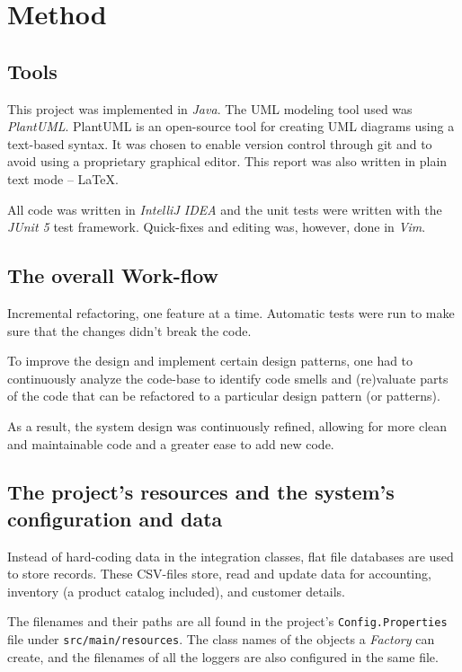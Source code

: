 \documentclass[a4paper]{scrreprt}
\begin{document}


\chapter{Method}
\section*{Tools}
This project was implemented in \emph{Java}.
The UML modeling tool used was \emph{PlantUML}.
PlantUML is an open-source tool for creating UML diagrams using a text-based
syntax.
It was chosen to enable version control through git and to avoid using a
proprietary graphical editor.
This report was also written in plain text mode -- \LaTeX.

All code was written in \emph{IntelliJ IDEA} and the unit tests were written with the \emph{JUnit 5} test framework.
Quick-fixes and editing was, however, done in \emph{Vim}.

\section*{The overall Work-flow}
Incremental refactoring, one feature at a time.
Automatic tests were run to make sure that the changes didn't break the code.

To improve the design and implement certain design patterns,
one had to continuously analyze the code-base to identify code smells and
(re)valuate parts of the code that can be refactored to a
particular design pattern (or patterns).

As a result, the system design was continuously refined,
allowing for more clean and maintainable code and a greater ease to add new code.

\section*{The project's resources and the system's configuration and data}
\label{sec:resources}
Instead of hard-coding data in the integration classes,
flat file databases are used to store records.
These CSV-files store,
read and update data for accounting, inventory (a product catalog included), and customer details.

The filenames and their paths are all found in the project's \verb|Config.Properties|
file under \verb|src/main/resources|.
The class names of the objects a \emph{Factory} can create, and the filenames of all the loggers are also
configured in the same file.
\end{document}
